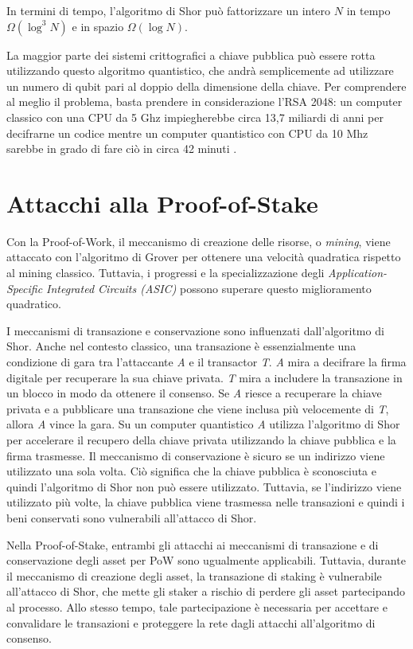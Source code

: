 In termini di tempo, l'algoritmo di Shor può fattorizzare un intero \(N\) in tempo \(\Omega(\log^3 N)\) e in spazio \(\Omega(\log N)\).

La maggior parte dei sistemi crittografici a chiave pubblica può essere rotta utilizzando questo algoritmo quantistico, che andrà semplicemente ad utilizzare un numero di qubit pari al doppio della dimensione della chiave. Per comprendere al meglio il problema, basta prendere in considerazione l'RSA 2048: un computer classico con una CPU da 5 Ghz impiegherebbe circa 13,7 miliardi di anni per decifrarne un codice mentre un computer quantistico con CPU da 10 Mhz sarebbe in grado di fare ciò in circa 42 minuti \cite{kearney2021vulnerability}.

\section{Attacchi alla Proof-of-Stake}
Con la Proof-of-Work, il meccanismo di creazione delle risorse, o \textit{mining}, viene attaccato con l'algoritmo di Grover per ottenere una velocità quadratica rispetto al mining classico. Tuttavia, i progressi e la specializzazione degli \textit{Application-Specific Integrated Circuits (ASIC)} possono superare questo miglioramento quadratico.

I meccanismi di transazione e conservazione sono influenzati dall'algoritmo di Shor. Anche nel contesto classico, una transazione è essenzialmente una condizione di gara tra l'attaccante \textit{A} e il transactor \textit{T}. \textit{A} mira a decifrare la firma digitale per recuperare la sua chiave privata. \textit{T} mira a includere la transazione in un blocco in modo da ottenere il consenso. Se \textit{A} riesce a recuperare la chiave privata e a pubblicare una transazione che viene inclusa più velocemente di \textit{T}, allora \textit{A} vince la gara. Su un computer quantistico \textit{A} utilizza l'algoritmo di Shor per accelerare il recupero della chiave privata utilizzando la chiave pubblica e la firma trasmesse. Il meccanismo di conservazione è sicuro se un indirizzo viene utilizzato una sola volta. Ciò significa che la chiave pubblica è sconosciuta e quindi l'algoritmo di Shor non può essere utilizzato. Tuttavia, se l'indirizzo viene utilizzato più volte, la chiave pubblica viene trasmessa nelle transazioni e quindi i beni conservati sono vulnerabili all'attacco di Shor.

Nella Proof-of-Stake, entrambi gli attacchi ai meccanismi di transazione e di conservazione degli asset per PoW sono ugualmente applicabili. Tuttavia, durante il meccanismo di creazione degli asset, la transazione di staking è vulnerabile all'attacco di Shor, che mette gli staker a rischio di perdere gli asset partecipando al processo. Allo stesso tempo, tale partecipazione è necessaria per accettare e convalidare le transazioni e proteggere la rete dagli attacchi all'algoritmo di consenso.

